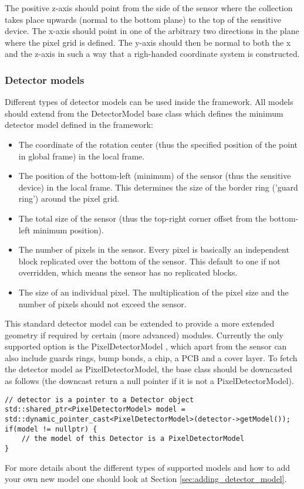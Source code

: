 The positive z-axis should point from the side of the sensor where the collection takes place upwards (normal to the bottom plane) to the top of the sensitive device. The x-axis should point in one of the arbitrary two directions in the plane where the pixel grid is defined. The y-axis should then be normal to both the x and the z-axis in such a way that a righ-handed coordinate system is constructed. 

\subsubsection{Detector models}
\label{sec:detector_models}
Different types of detector models can be used inside the framework. All models should extend from the DetectorModel base class which defines the minimum detector model defined in the framework:
\begin{itemize}
\item The coordinate of the rotation center (thus the specified position of the point in global frame) in the local frame.
\item The position of the bottom-left (minimum) of the sensor (thus the sensitive device) in the local frame. This determines the size of the border ring ('guard ring') around the pixel grid. 
\item The total size of the sensor (thus the top-right corner offset from the bottom-left minimum position).
\item The number of pixels in the sensor. Every pixel is basically an independent block replicated over the bottom of the sensor. This default to one if not overridden, which means the sensor has no replicated blocks.
\item The size of an individual pixel. The multiplication of the pixel size and the number of pixels should not exceed the sensor.
\end{itemize}

This standard detector model can be extended to provide a more extended geometry if required by certain (more advanced) modules. Currently the only supported option is the PixelDetectorModel , which apart from the sensor can also include guards rings, bump bonds, a chip, a PCB and a cover layer. To fetch the detector model as PixelDetectorModel, the base class should be downcasted as follows (the downcast return a null pointer if it is not a PixelDetectorModel).
\begin{verbatim}
// detector is a pointer to a Detector object
std::shared_ptr<PixelDetectorModel> model = std::dynamic_pointer_cast<PixelDetectorModel>(detector->getModel());
if(model != nullptr) {
    // the model of this Detector is a PixelDetectorModel
}
\end{verbatim}
For more details about the different types of supported models and how to add your own new model one should look at Section \ref{sec:adding_detector_model}.

